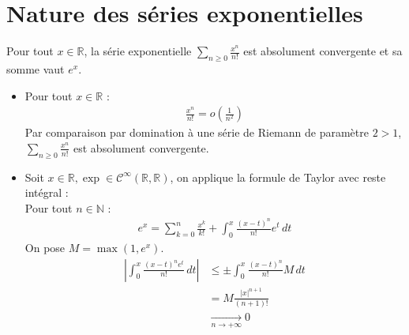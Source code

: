 \documentclass[../main.tex]{subfiles}
\begin{document}
\section{Nature des séries exponentielles}
\begin{tcolorbox}[title=Théorème 27.30, title filled=false, colframe=orange, colback=orange!10!white]
    Pour tout $x\in \mathbb{R}$, la série exponentielle $\sum\limits_{n\geq 0} \frac{x^n}{n!}$ est absolument convergente et sa somme vaut $e^x$. 
\end{tcolorbox}

\begin{itemize}
    \item Pour tout $x\in \mathbb{R}$ : 
    \begin{align*}
        \frac{x^n}{n!} = o \left( \frac{1}{n^2} \right)
    \end{align*}
    Par comparaison par domination à une série de Riemann de paramètre $2 > 1$, $\sum\limits_{n\geq 0} \frac{x^n}{n!}$ est absolument convergente. 

    \item Soit $x\in \mathbb{R}, \exp \in \mathcal{C}^{\infty}(\mathbb{R}, \mathbb{R})$, on applique la formule de Taylor avec reste intégral : \\
    Pour tout $n\in \mathbb{N}$ : 
    \begin{align*}
        e^x = \sum_{k=0}^{n} \frac{x^k}{k!} + \int_{0}^{x} \frac{(x-t)^n}{n!} e^t \,dt
    \end{align*}
    On pose $M = \max (1, e^x)$. 
    \begin{align*}
        \left| \int_{0}^{x} \frac{(x - t)^n e^t}{n!} \,dt \right| &\leq \pm \int_{0}^{x} \frac{(x - t)^n}{n!} M \,dt \\
        &= M \frac{|x|^{n+1}}{(n+1)!} \\
        &\underset{n \to +\infty}{\longrightarrow} 0
    \end{align*}
\end{itemize}

\end{document}
